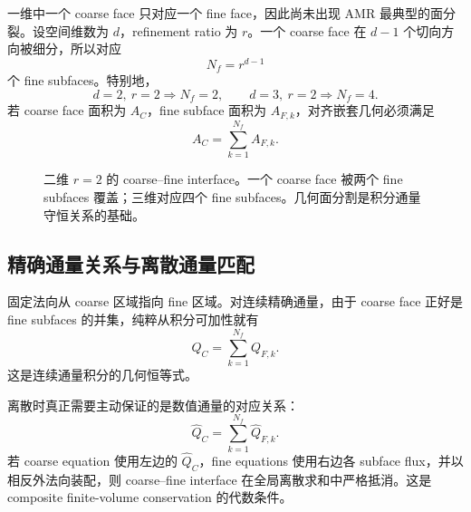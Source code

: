 一维中一个 coarse face 只对应一个 fine face，因此尚未出现 AMR 最典型的面分裂。设空间维数为 $d$，refinement ratio 为 $r$。一个 coarse face 在 $d-1$ 个切向方向被细分，所以对应
\begin{equation}
N_f=r^{d-1}
\end{equation}
个 fine subfaces。特别地，
\begin{equation}
d=2,\ r=2\Rightarrow N_f=2,
\qquad
d=3,\ r=2\Rightarrow N_f=4.
\end{equation}
若 coarse face 面积为 $A_C$，fine subface 面积为 $A_{F,k}$，对齐嵌套几何必须满足
\begin{equation}
A_C=\sum_{k=1}^{N_f}A_{F,k}.
\label{eq:amr_face_area_partition}
\end{equation}

\begin{figure}[htbp]
\centering
{}
\caption{二维 $r=2$ 的 coarse--fine interface。一个 coarse face 被两个 fine subfaces 覆盖；三维对应四个 fine subfaces。几何面分割是积分通量守恒关系的基础。}
\label{fig:amr-two-dimensional-face-split}
\end{figure}

\subsection{精确通量关系与离散通量匹配}

固定法向从 coarse 区域指向 fine 区域。对连续精确通量，由于 coarse face 正好是 fine subfaces 的并集，纯粹从积分可加性就有
\begin{equation}
Q_C
=\sum_{k=1}^{N_f}Q_{F,k}.
\label{eq:amr-exact-flux-partition}
\end{equation}
这是连续通量积分的几何恒等式。

离散时真正需要主动保证的是数值通量的对应关系：
\begin{equation}
\boxed{
\widehat Q_C
=
\sum_{k=1}^{N_f}\widehat Q_{F,k}.
}
\label{eq:amr_flux_matching_general}
\end{equation}
若 coarse equation 使用左边的 $\widehat Q_C$，fine equations 使用右边各 subface flux，并以相反外法向装配，则 coarse--fine interface 在全局离散求和中严格抵消。这是 composite finite-volume conservation 的代数条件。


